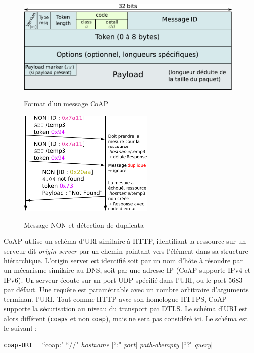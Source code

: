 \documentclass[]{report}
\begin{document}
\begin{figure}[!ht]
\begin{minipage}{0.59\textwidth}
		\includegraphics[width=0.85\linewidth]{CoAP_pkt}
		\caption{Format d'un message CoAP \cite{rfc7252}}
		\label{fig:CoAP_pkt}
		\vspace{0.1cm}
		\includegraphics[width=0.59\textwidth]{CoAP_messaging_NON}
		\caption{Message NON et détection de duplicata}
		\label{fig:CoAP_NON}
		
		
	\end{minipage}	
\end{figure}



\newpage

CoAP utilise un schéma d'URI similaire à HTTP, identifiant la ressource sur un serveur dit \textit{origin server} par un chemin pointant vers l'élément dans sa structure hiérarchique. L'origin server est identifié soit par un nom d'hôte à résoudre par un mécanisme similaire au DNS, soit par une adresse IP (CoAP supporte IPv4 et IPv6). Un serveur écoute sur un port UDP spécifié dans l'URI,  ou le port 5683 par défaut. Une requête est paramétrable avec un nombre arbitraire d'arguments terminant l'URI. Tout comme HTTP avec son homologue HTTPS, CoAP supporte la sécurisation au niveau du transport par DTLS. Le schéma d'URI est alors différent (\texttt{coaps} et non \texttt{coap}), mais ne sera pas considéré ici. Le schéma est le suivant \cite{rfc7252} :
\vspace{0.1cm}
\begin{center}
\texttt{coap-URI} = ``coap:" ``//" \textit{hostname} [``:" \textit{port}] \textit{path-abempty} [``?" \textit{query}] 
\end{center}
\end{document}
